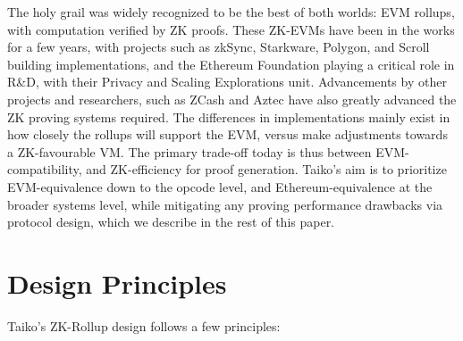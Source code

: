 \documentclass[9pt,oneside]{amsart}
\begin{document}
\begin{multicols}{2}
The holy grail was widely recognized to be the best of both worlds: EVM rollups, with computation verified by ZK proofs. These ZK-EVMs have been in the works for a few years, with projects such as zkSync, Starkware, Polygon, and Scroll building implementations, and the Ethereum Foundation playing a critical role in R\&D, with their Privacy and Scaling Explorations unit\cite{pse}. Advancements by other projects and researchers, such as ZCash and Aztec have also greatly advanced the ZK proving systems required. The differences in implementations mainly exist in how closely the rollups will support the EVM, versus make adjustments towards a ZK-favourable VM. The primary trade-off today is thus between EVM-compatibility, and ZK-efficiency for proof generation. Taiko’s aim is to prioritize EVM-equivalence down to the opcode level, and Ethereum-equivalence at the broader systems level, while mitigating any proving performance drawbacks via protocol design, which we describe in the rest of this paper. 

\section{Design Principles}

Taiko's ZK-Rollup design follows a few principles:


\end{multicols}
\end{document}
